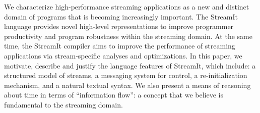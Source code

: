We characterize high-performance streaming applications as a new and
distinct domain of programs that is becoming increasingly important.
The StreamIt language provides novel high-level representations to
improve programmer productivity and program robustness within the
streaming domain.  At the same time, the StreamIt compiler aims to
improve the performance of streaming applications via stream-specific
analyses and optimizations.  In this paper, we motivate, describe and
justify the language features of StreamIt, which include: a structured
model of streams, a messaging system for control, a re-initialization
mechanism, and a natural textual syntax.  We also present a means of
reasoning about time in terms of ``information flow'': a concept that
we believe is fundamental to the streaming domain.

